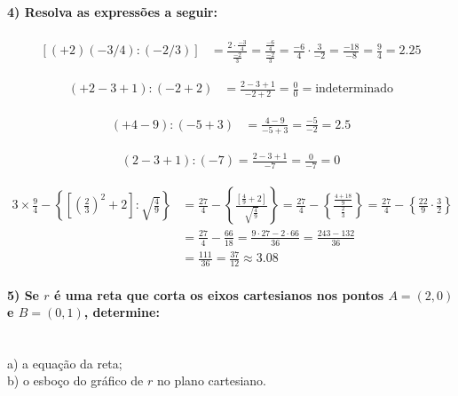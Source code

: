 \documentclass[pdftex, brazil, 12pt, oneside]{article}
\begin{document}
\paragraph{4) Resolva as expressões a seguir:}

\begin{equation}
  \begin{split}
    [(+2)(-3/4):(-2/3)] &= \frac{2 \cdot \frac{-3}{4}}{\frac{-2}{3}} = \frac{\frac{-6}{4}}{\frac{-2}{3}} = \frac{-6}{4} \cdot \frac{3}{-2}
    = \frac{-18}{-8} = \frac{9}{4} = 2.25
  \end{split}
\end{equation}

\begin{equation}
  \begin{split}
    (+2-3+1):(-2+2) &= \frac{2-3+1}{-2+2} = \frac{0}{0} = \text{indeterminado}
  \end{split}
\end{equation}

\begin{equation}
  \begin{split}
    (+4-9):(-5+3) &= \frac{4-9}{-5+3} = \frac{-5}{-2} = 2.5
  \end{split}
\end{equation}

\begin{equation}
  \begin{split}
    (2-3+1):(-7) = \frac{2-3+1}{-7} = \frac{0}{-7} = 0
  \end{split}
\end{equation}

\begin{equation}
  \begin{split}
    3 \times \frac{9}{4} - \left\{ \left[ \left(\frac{2}{3}\right)^2 + 2 \right]:\sqrt{\frac{4}{9}} \right\} &=
    \frac{27}{4} - \left\{ \frac{\left[ \frac{4}{9} + 2 \right]}{\sqrt{\frac{4}{9}}} \right\} = \frac{27}{4}-\left\{\frac{\frac{4 + 18}{9}}{\frac{2}{3}} \right\} = \frac{27}{4} - \left\{ \frac{22}{9} \cdot \frac{3}{2} \right\}\\
    &= \frac{27}{4} - \frac{66}{18}  = \frac{9 \cdot 27 - 2 \cdot 66}{36} = \frac{243-132}{36}\\
    &= \frac{111}{36} = \frac{37}{12} \approx 3.08
  \end{split}
\end{equation}

\paragraph{5) Se $r$ é uma reta que corta os eixos cartesianos nos pontos $A=(2,0)$ e $B=(0,1)$,
determine:}\ \\
a) a equação da reta;\\
b) o esboço do gráfico de $r$ no plano cartesiano.
\end{document}
